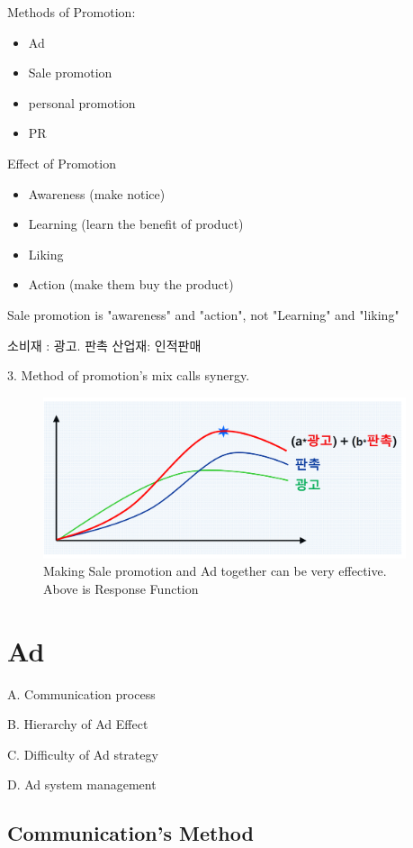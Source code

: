\documentclass[12pt]{article}
\begin{document}
\begin{itemize}
Methods of Promotion:
\begin{itemize}
	\item Ad
	\item Sale promotion
	\item personal promotion
	\item PR
\end{itemize}


Effect of Promotion

\begin{itemize}
	\item Awareness (make notice)
	\item Learning (learn the benefit of product)
	\item Liking
	\item Action (make them buy the product)
\end{itemize}

Sale promotion is "awareness" and "action", not "Learning" and "liking"

소비재 : 광고. 판촉
산업재: 인적판매

3. Method of promotion's mix calls synergy.


\begin{figure}[H]
	\centering
	\includegraphics[width=0.95\textwidth]{img/promotionSyn.png}
	\caption{Making Sale promotion and Ad together can be very effective. Above is Response Function}
	\label{}
\end{figure}


\section{Ad}

A. Communication process

B. Hierarchy of Ad Effect

C. Difficulty of Ad strategy

D. Ad system management


\subsection{Communication's Method}


\end{itemize}
\end{document}
